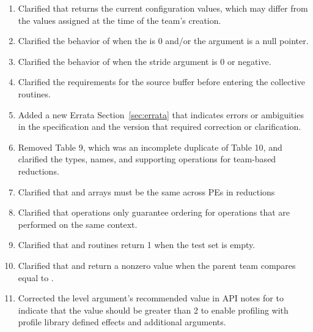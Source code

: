 \begin{enumerate}
%
\item Clarified that  returns the current
    configuration values, which may differ from the values assigned at the
        time of the team's creation.
%
\item Clarified the behavior of  when the
     is 0 and/or the  argument is a null pointer.
%
\item Clarified the behavior of  when the
    stride argument is 0 or negative.
%
\item Clarified the requirements for the source buffer before entering the
    collective routines.
%
\item Added a new Errata Section~\ref{sec:errata} that indicates errors or ambiguities in the
    \openshmem specification and the version that required correction or clarification.
%
\item Removed \openshmem[1.5] Table 9, which was an incomplete duplicate of
    \openshmem[1.5] Table 10, and clarified the types, names, and supporting
    operations for team-based reductions. \label{changelog:reduction_table}
%
%
\item Clarified that  and  arrays must be the same
    across \acp{PE} in \openshmem reductions \label{changelog:reduction_args}
%
\item Clarified that  operations only guarantee ordering for
    operations that are performed on the same context. \label{changelog:fence_ctx}
%
%
\item Clarified that  and 
    routines return 1 when the test set is empty. \label{changelog:test_all}
%
%
\item Clarified that  and
     return a nonzero value when the parent
        team compares equal to . \label{changelog:split_strided_2d}
%
%
\item Corrected the level argument's recommended value in API notes for
     to indicate that the value should be greater than
    2 to enable profiling with profile library defined effects and
    additional arguments. \label{changelog:pcontrol}
%

\end{enumerate}

